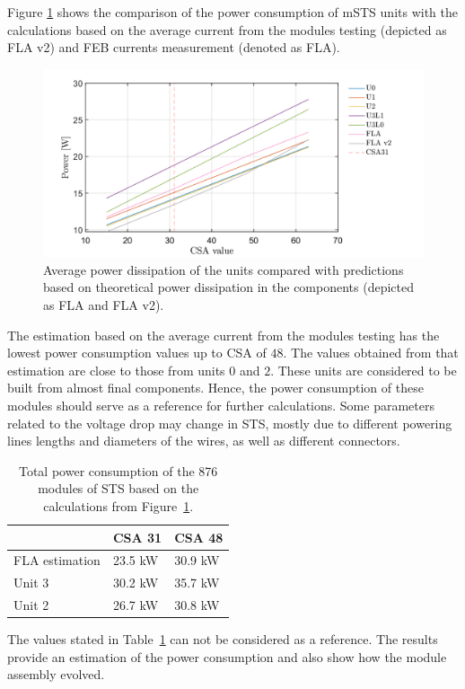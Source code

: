 Figure \ref{fig_theor} shows the comparison of the power consumption of \gls{mSTS} units with the calculations based on the average current from the modules testing (depicted as FLA v2) and FEB currents measurement (denoted as FLA). 

\begin{figure}[h!]
\centering
\includegraphics[width=0.95\columnwidth]{Chapter6/DCS/images/theor.png}
\caption{Average power dissipation of the units compared with predictions based on theoretical power dissipation in the components (depicted as FLA and FLA v2).} 
\label{fig_theor}
\end{figure}
The estimation based on the average current from the modules testing has the lowest power consumption values up to CSA of $48$. The values obtained from that estimation are close to those from units $0$ and $2$. These units are considered to be built from almost final components. Hence, the power consumption of these modules should serve as a reference for further calculations. Some parameters related to the voltage drop may change in \gls{STS}, mostly due to different powering lines lengths and diameters of the wires, as well as different connectors. 
\begin{table}[h!]
\caption{Total power consumption of the 876 modules of \gls{STS} based on the calculations from Figure~\ref{fig_theor}.}
\centering
\begin{tabular}{lll}
\hline
               & \gls{CSA} 31  & \gls{CSA} 48  \\ \hline
FLA estimation & 23.5 kW & 30.9 kW \\
Unit 3         & 30.2 kW & 35.7 kW \\
Unit 2         & 26.7 kW & 30.8 kW \\ \hline
\end{tabular}

\label{tab:power_cons}
\end{table}
The values stated in Table~\ref{tab:power_cons} can not be considered as a reference. The results provide an estimation of the power consumption and also show how the module assembly evolved. 
